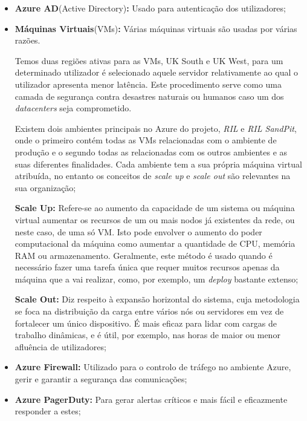         \begin{itemize}
            \item \textbf{Azure AD}(Active Directory)\textbf{:} Usado para autenticação dos utilizadores;
            \item \textbf{Máquinas Virtuais}(VMs)\textbf{:} Várias máquinas virtuais são usadas por várias razões.
            
            Temos duas regiões ativas para as VMs, UK South e UK West, para um determinado utilizador é selecionado aquele servidor relativamente ao qual o utilizador apresenta menor latência. Este procedimento serve como uma camada de segurança contra desastres naturais ou humanos caso um dos \textit{datacenters} seja comprometido.
            
            Existem dois ambientes principais no Azure do projeto, \textit{RIL} e \textit{RIL SandPit}, onde o primeiro contém todas as VMs relacionadas com o ambiente de produção e o segundo todas as relacionadas com os outros ambientes e as suas diferentes finalidades. Cada ambiente tem a sua própria máquina virtual atribuída, no entanto os conceitos de \textit{scale up} e \textit{scale out} são relevantes na sua organização;

            \textbf{Scale Up:} Refere-se ao aumento da capacidade de um sistema ou máquina virtual aumentar os recursos de um ou mais nodos já existentes da rede, ou neste caso, de uma só VM. Isto pode envolver o aumento do poder computacional da máquina como aumentar a quantidade de CPU, memória RAM ou armazenamento. Geralmente, este método é usado quando é necessário fazer uma tarefa única que requer muitos recursos apenas da máquina que a vai realizar, como, por exemplo, um \textit{deploy} bastante extenso;

            \textbf{Scale Out:} Diz respeito à expansão horizontal do sistema, cuja metodologia se foca na distribuição da carga entre vários nós ou servidores em vez de fortalecer um único dispositivo. É mais eficaz para lidar com cargas de trabalho dinâmicas, e é útil, por exemplo, nas horas de maior ou menor afluência de utilizadores\cite{scale-up-scale-out};

            \item \textbf{Azure Firewall:} Utilizado para o controlo de tráfego no ambiente Azure, gerir e garantir a segurança das comunicações;

            \item \textbf{Azure PagerDuty:} Para gerar alertas críticos e mais fácil e eficazmente responder a estes;
            

\end{itemize}
